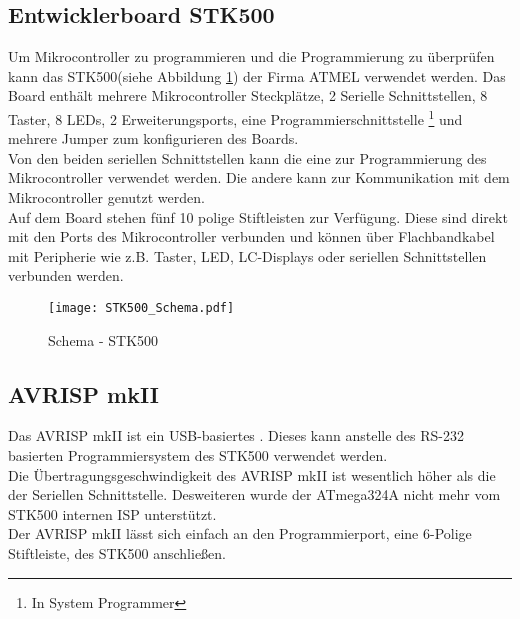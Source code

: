 \subsection{Entwicklerboard STK500}
Um Mikrocontroller zu programmieren und die Programmierung zu überprüfen kann das  STK500(siehe Abbildung \ref{fig:STK500}) der Firma ATMEL verwendet werden. Das Board enthält mehrere Mikrocontroller Steckplätze, 2 Serielle Schnittstellen, 8 Taster, 8 LEDs, 2 Erweiterungsports, eine Programmierschnittstelle \footnote{In System Programmer} und mehrere Jumper zum konfigurieren des Boards.\\
Von den beiden seriellen Schnittstellen kann die eine zur Programmierung des Mikrocontroller verwendet werden. Die andere kann zur Kommunikation mit dem Mikrocontroller genutzt werden.\\
Auf dem Board stehen fünf 10 polige Stiftleisten 
zur Verfügung. Diese sind direkt mit den Ports des Mikrocontroller verbunden und können über Flachbandkabel mit Peripherie wie z.B. Taster, LED, LC-Displays oder seriellen Schnittstellen verbunden werden.
\begin{figure}[htb]
\centering
\texttt{[image: STK500\_Schema.pdf]}
\caption{Schema - STK500}
\label{fig:STK500}
\citep{atmel:ug_STK500}
\end{figure}

\subsection{AVRISP mkII}
Das AVRISP mkII ist ein USB-basiertes . Dieses kann anstelle des RS-232 basierten Programmiersystem des STK500 verwendet werden.\\
Die Übertragungsgeschwindigkeit des AVRISP mkII ist wesentlich höher als die der Seriellen Schnittstelle. Desweiteren wurde der ATmega324A nicht mehr vom STK500 internen ISP unterstützt.\\
Der AVRISP mkII lässt sich einfach an den Programmierport, eine 6-Polige Stiftleiste, des STK500 anschließen.

